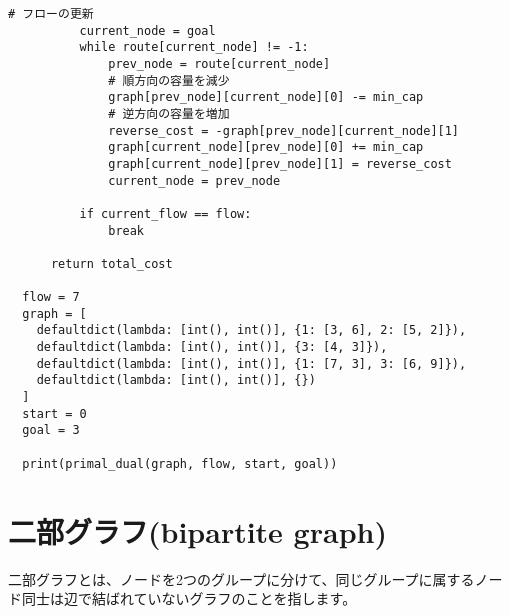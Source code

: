\documentclass{jlreq}
\begin{document}
\begin{lstlisting}[caption=プライマル・デュアル法の実装, label=primal_dual, frame=TRBL, label={primal_dual}]
          # フローの更新
          current_node = goal
          while route[current_node] != -1:
              prev_node = route[current_node]
              # 順方向の容量を減少
              graph[prev_node][current_node][0] -= min_cap 
              # 逆方向の容量を増加
              reverse_cost = -graph[prev_node][current_node][1]
              graph[current_node][prev_node][0] += min_cap 
              graph[current_node][prev_node][1] = reverse_cost
              current_node = prev_node
  
          if current_flow == flow:
              break
  
      return total_cost
  
  flow = 7
  graph = [
    defaultdict(lambda: [int(), int()], {1: [3, 6], 2: [5, 2]}),
    defaultdict(lambda: [int(), int()], {3: [4, 3]}),
    defaultdict(lambda: [int(), int()], {1: [7, 3], 3: [6, 9]}),
    defaultdict(lambda: [int(), int()], {})
  ]
  start = 0
  goal = 3
  
  print(primal_dual(graph, flow, start, goal))
\end{lstlisting}

\newpage

\section{二部グラフ(bipartite graph)}
二部グラフとは、ノードを2つのグループに分けて、同じグループに属するノード同士は辺で結ばれていないグラフのことを指します。

\vspace{0.5cm}

\begin{center}
\end{center}
\end{document}
